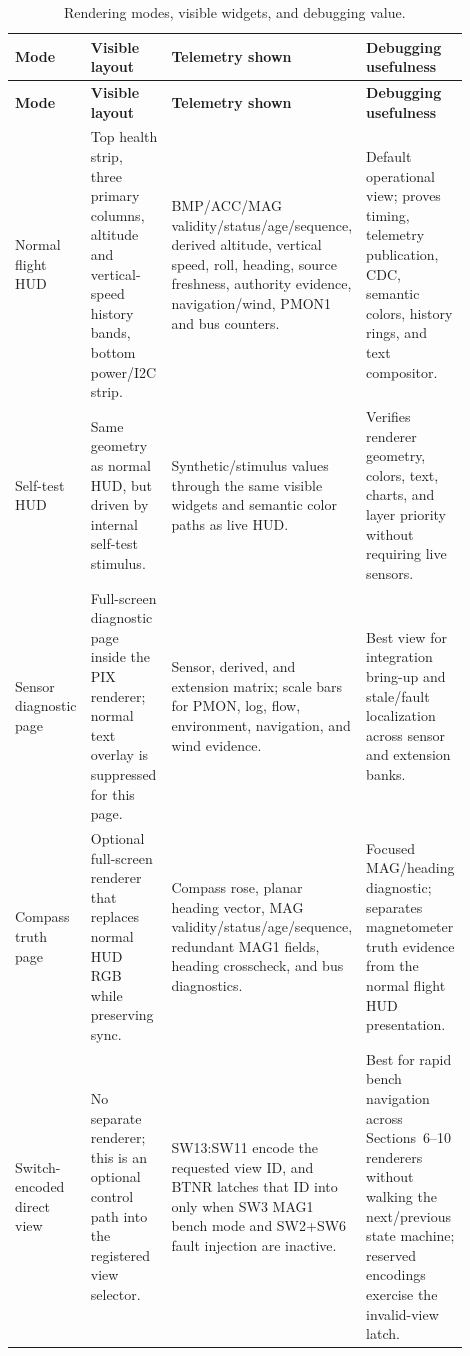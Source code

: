 \documentclass[12pt,letterpaper,final,onecolumn,titlepage]{article}
\DeclareRobustCommand{\sig}[1]{\texttt{\detokenize{#1}}}
\begin{document}
\small
\begin{longtable}{L{0.18\linewidth} L{0.23\linewidth} L{0.26\linewidth} L{0.23\linewidth}}
\caption{Rendering modes, visible widgets, and debugging value.}
\label{tab:modes}\\
\toprule
\textbf{Mode} & \textbf{Visible layout} & \textbf{Telemetry shown} & \textbf{Debugging usefulness} \\
\midrule
\endfirsthead
\toprule
\textbf{Mode} & \textbf{Visible layout} & \textbf{Telemetry shown} & \textbf{Debugging usefulness} \\
\midrule
\endhead
Normal flight HUD &
Top health strip, three primary columns, altitude and vertical-speed history
bands, bottom power/I2C strip. &
BMP/ACC/MAG validity/status/age/sequence, derived altitude, vertical speed,
roll, heading, source freshness, authority evidence, navigation/wind, PMON1
and bus counters. &
Default operational view; proves timing, telemetry publication, CDC,
semantic colors, history rings, and text compositor. \\
Self-test HUD &
Same geometry as normal HUD, but driven by internal self-test stimulus. &
Synthetic/stimulus values through the same visible widgets and semantic color
paths as live HUD. &
Verifies renderer geometry, colors, text, charts, and layer priority without
requiring live sensors. \\
Sensor diagnostic page &
Full-screen diagnostic page inside the PIX renderer; normal text overlay is
suppressed for this page. &
Sensor, derived, and extension matrix; scale bars for PMON, log, flow,
environment, navigation, and wind evidence. &
Best view for integration bring-up and stale/fault localization across sensor
and extension banks. \\
Compass truth page &
Optional full-screen renderer that replaces normal HUD RGB while preserving sync. &
Compass rose, planar heading vector, MAG validity/status/age/sequence,
redundant MAG1 fields, heading crosscheck, and bus diagnostics. &
Focused MAG/heading diagnostic; separates magnetometer truth evidence from the
normal flight HUD presentation. \\
Switch-encoded direct view &
No separate renderer; this is an optional control path into the registered view
selector. &
SW13:SW11 encode the requested view ID, and BTNR latches that ID into
\sig{view_direct_id_sys} only when SW3 MAG1 bench mode and SW2+SW6 fault
injection are inactive. &
Best for rapid bench navigation across Sections~6--10 renderers without
walking the next/previous state machine; reserved encodings exercise the
invalid-view latch. \\
\bottomrule
\end{longtable}
\normalsize
\end{document}

